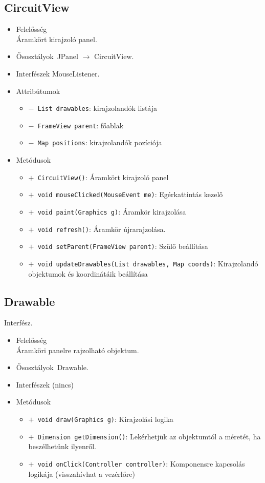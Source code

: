 \subsection{CircuitView}
\begin{itemize}
\item Felelősség\\
Áramkört kirajzoló panel.
\item Ősosztályok\ JPanel $\rightarrow{}$ CircuitView.
\item Interfészek MouseListener.
\item Attribútumok $\ $
\begin{itemize}
	\item[] \texttt{$-$ List drawables}: kirajzolandók listája
	\item[] \texttt{$-$ FrameView parent}: főablak
	\item[] \texttt{$-$ Map positions}: kirajzolandók pozíciója
\end{itemize}
\item Metódusok$\ $
\begin{itemize}
	\item[] \texttt{$+$ CircuitView()}: Áramkört kirajzoló panel
	\item[] \texttt{$+$ void mouseClicked(MouseEvent me)}: Egérkattintás kezelő
	\item[] \texttt{$+$ void paint(Graphics g)}: Áramkör kirajzolása
	\item[] \texttt{$+$ void refresh()}: Áramkör újrarajzolása.
	\item[] \texttt{$+$ void setParent(FrameView parent)}: Szülő beállítása
	\item[] \texttt{$+$ void updateDrawables(List drawables, Map coords)}: Kirajzolandó objektumok és koordinátáik beállítása
\end{itemize}
\end{itemize}

\subsection{Drawable}
Interfész.
\begin{itemize}
\item Felelősség\\
Áramköri panelre rajzolható objektum.
\item Ősosztályok\ Drawable.
\item Interfészek (nincs)
\item Metódusok$\ $
\begin{itemize}
	\item[] \texttt{$+$ void draw(Graphics g)}: Kirajzolási logika
	\item[] \texttt{$+$ Dimension getDimension()}: Lekérhetjük az objektumtól a méretét, ha beszélhetünk ilyenről.
	\item[] \texttt{$+$ void onClick(Controller controller)}: Komponensre kapcsolás logikája (visszahívhat a vezérlőre)
\end{itemize}
\end{itemize}

